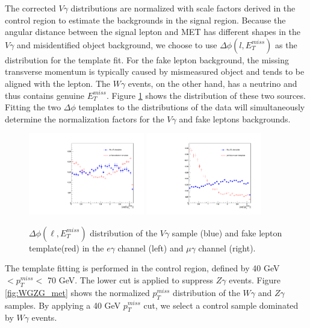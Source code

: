 \documentclass[thesis.tex]{subfiles}
\renewcommand\_{\textunderscore\allowbreak}
\begin{document}
The corrected $V\gamma$ distributions are normalized with scale factors derived in the control region to estimate the backgrounds in the signal region. 
Because the angular distance between the signal lepton and MET has different shapes in the $V\gamma$ and misidentified object background, we choose to use $\Delta\phi(l,E_{T}^{miss})$ as the distribution for the template fit. For the fake lepton background, the missing transverse momentum is typically caused by mismeasured object and tends to be aligned with the lepton. The $W\gamma$ events, on the other hand, has a neutrino and thus contains genuine $E_{T}^{miss}$. Figure \ref{fig:dphitemplate} shows the distribution of these two sources. Fitting the two $\Delta\phi$ templates to the distributions of the data will simultaneously determine the normalization factors for the $V\gamma$ and fake leptons backgrounds. 

\begin{figure}[hbtp]
    \begin{center}
    \includegraphics[width=0.45\textwidth]{Figures/dphiTemplate_eg.pdf}
    \includegraphics[width=0.45\textwidth]{Figures/dphiTemplate_mg.pdf}
    \end{center}
  \caption{$\Delta\phi\left(\ell,E_{T}^{miss}\right)$ distribution of the $V\gamma$ sample (blue) and fake lepton template(red) in the $e\gamma$ channel (left) and $\mu\gamma$ channel (right). }
    \label{fig:dphitemplate}
\end{figure}

The template fitting is performed in the control region, defined by 40 GeV $< p_{T}^{miss} <$ 70 GeV. The lower cut is applied to suppress $Z\gamma$ events. Figure \ref{fig:WGZG_met} shows the normalized $p_{T}^{miss}$ distribution of the $W\gamma$ and $Z\gamma$ samples. By applying a 40 GeV $p_{T}^{miss}$ cut, we select a control sample dominated by $W\gamma$ events.  
\end{document}
